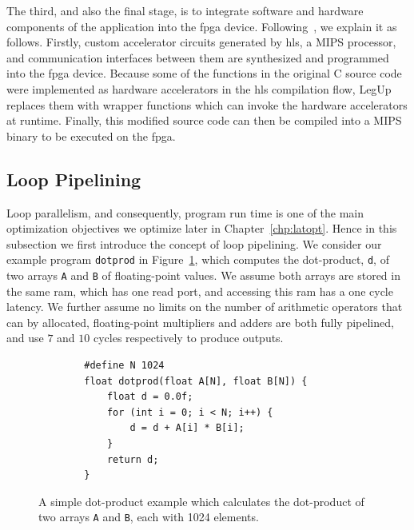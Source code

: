 The third, and also the final stage, is to integrate software and
hardware components of the application into the \gls{fpga} device.
Following~\cite{canis13}, we explain it as follows.  Firstly, custom
accelerator circuits generated by \gls{hls}, a MIPS processor, and
communication interfaces between them are synthesized and programmed into the
\gls{fpga} device.  Because some of the functions in the original C source
code were implemented as hardware accelerators in the \gls{hls} compilation
flow, LegUp replaces them with wrapper functions which can invoke the hardware
accelerators at runtime.  Finally, this modified source code can then be
compiled into a MIPS binary to be executed on the \gls{fpga}\@.


\subsection{Loop Pipelining}
\label{bg:sub:pipelining}

Loop parallelism, and consequently, program run time is one of the main
optimization objectives we optimize later in Chapter~\ref{chp:latopt}.  Hence
in this subsection we first introduce the concept of loop pipelining.  We
consider our example program \verb|dotprod| in Figure~\ref{bg:lst:dotprod},
which computes the dot-product, \verb|d|, of two arrays \verb|A| and \verb|B|
of floating-point values.  We assume both arrays are stored in the same
\gls{ram}, which has one read port, and accessing this \gls{ram} has a one
cycle latency.  We further assume no limits on the number of arithmetic
operators that can by allocated, floating-point multipliers and adders are both
fully pipelined, and use $7$ and $10$ cycles respectively to produce outputs.
\begin{figure}[ht]
    \centering
    \begin{lstlisting}
        #define N 1024
        float dotprod(float A[N], float B[N]) {
            float d = 0.0f;
            for (int i = 0; i < N; i++) {
                d = d + A[i] * B[i];
            }
            return d;
        }
    \end{lstlisting}
    \caption{%
        A simple dot-product example which calculates the dot-product of two
        arrays \texttt{A} and \texttt{B}, each with 1024 elements.
    }\label{bg:lst:dotprod}
\end{figure}

